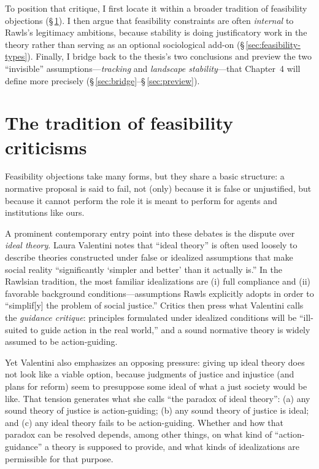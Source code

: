 \documentclass[12pt]{report}
\begin{document}
To position that critique, I first locate it within a broader tradition of feasibility objections (\S\,\ref{sec:feasibility-tradition}). I then argue that feasibility constraints are often \emph{internal} to Rawls's legitimacy ambitions, because stability is doing justificatory work in the theory rather than serving as an optional sociological add-on (\S\,\ref{sec:feasibility-types}). Finally, I bridge back to the thesis's two conclusions and preview the two ``invisible'' assumptions---\emph{tracking} and \emph{landscape stability}---that Chapter~4 will define more precisely (\S\,\ref{sec:bridge}--\S\,\ref{sec:preview}).

\section{The tradition of feasibility criticisms}\label{sec:feasibility-tradition}

Feasibility objections take many forms, but they share a basic structure: a normative proposal is said to fail, not (only) because it is false or unjustified, but because it cannot perform the role it is meant to perform for agents and institutions like ours.

A prominent contemporary entry point into these debates is the dispute over \emph{ideal theory}. Laura Valentini notes that ``ideal theory'' is often used loosely to describe theories constructed under false or idealized assumptions that make social reality ``significantly `simpler and better' than it actually is.''\parencite[p.~332]{valentini2009paradox} In the Rawlsian tradition, the most familiar idealizations are (i) full compliance and (ii) favorable background conditions---assumptions Rawls explicitly adopts in order to ``simplif[y] the problem of social justice.''\parencite[p.~332]{valentini2009paradox} Critics then press what Valentini calls the \emph{guidance critique}: principles formulated under idealized conditions will be ``ill-suited to guide action in the real world,'' and a sound normative theory is widely assumed to be action-guiding.\parencite[p.~333]{valentini2009paradox}

Yet Valentini also emphasizes an opposing pressure: giving up ideal theory does not look like a viable option, because judgments of justice and injustice (and plans for reform) seem to presuppose some ideal of what a just society would be like.\parencite[p.~333]{valentini2009paradox} That tension generates what she calls ``the paradox of ideal theory'': (a) any sound theory of justice is action-guiding; (b) any sound theory of justice is ideal; and (c) any ideal theory fails to be action-guiding.\parencite[p.~333]{valentini2009paradox} Whether and how that paradox can be resolved depends, among other things, on what kind of ``action-guidance'' a theory is supposed to provide, and what kinds of idealizations are permissible for that purpose.
\end{document}
